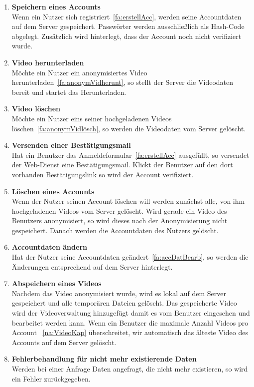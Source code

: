 \begin{enumerate}
\item \label{fa:accSpeichern}\textbf{Speichern eines Accounts} \hfill \\
Wenn ein Nutzer sich registriert~\eqref{fa:erstellAcc}, werden seine Accountdaten auf dem Server gespeichert. Passwörter werden ausschließlich als \gls{Hash-Code} abgelegt. Zusätzlich wird hinterlegt, dass der Account noch nicht verifiziert wurde.

\item \label{fa:vidHerunterladen}\textbf{Video herunterladen} \hfill \\
Möchte ein Nutzer ein anonymisiertes Video herunterladen~\eqref{fa:anonymVidherunt}, so stellt der Server die Videodaten bereit und startet das Herunterladen.

\item \label{fa:vidLöschen}\textbf{Video löschen} \hfill \\
Möchte ein Nutzer eins seiner hochgeladenen Videos löschen~\eqref{fa:anonymVidlösch}, so werden die Videodaten vom Server gelöscht.

\item \label{fa:mailSenden}\textbf{Versenden einer Bestätigungsmail} \hfill \\
Hat ein Benutzer das Anmeldeformular~\eqref{fa:erstellAcc} ausgefüllt, so versendet der \gls{Web-Dienst} eine Bestätigungsmail. Klickt der Benutzer auf den dort vorhanden Bestätigungslink so wird der Account verifiziert.

\item \label{fa:accLöschen}\textbf{Löschen eines Accounts} \hfill \\
Wenn der Nutzer seinen Account löschen will werden zunächst alle, von ihm hochgeladenen Videos vom Server gelöscht. Wird gerade ein Video des Benutzers anonymisiert, so wird dieses nach der Anonymisierung nicht gespeichert. Danach werden die Accountdaten des Nutzers gelöscht.

\item \label{fa:accÄndern}\textbf{Accountdaten ändern} \hfill \\
Hat der Nutzer seine Accountdaten geändert~\eqref{fa:accDatBearb}, so werden die Änderungen entsprechend auf dem Server hinterlegt.

\item \label{fa:speichVideo}\textbf{Abspeichern eines  Videos} \hfill \\
Nachdem das Video anonymisiert wurde, wird es lokal auf dem Server gespeichert und alle temporären Dateien gelöscht. Das gespeicherte Video wird der Videoverwaltung hinzugefügt damit es vom Benutzer eingesehen und bearbeitet werden kann. Wenn ein Benutzer die maximale Anzahl Videos pro Account ~\eqref{na:VideoKap} überschreitet, wir automatisch das älteste Video des Accounts auf dem Server gelöscht.

\item  \label{fa:fehlerbehandlung}\textbf{Fehlerbehandlung für nicht mehr existierende Daten} \hfill \\
Werden bei einer Anfrage Daten angefragt, die nicht mehr existieren, so wird ein Fehler zurückgegeben.
\end{enumerate}

